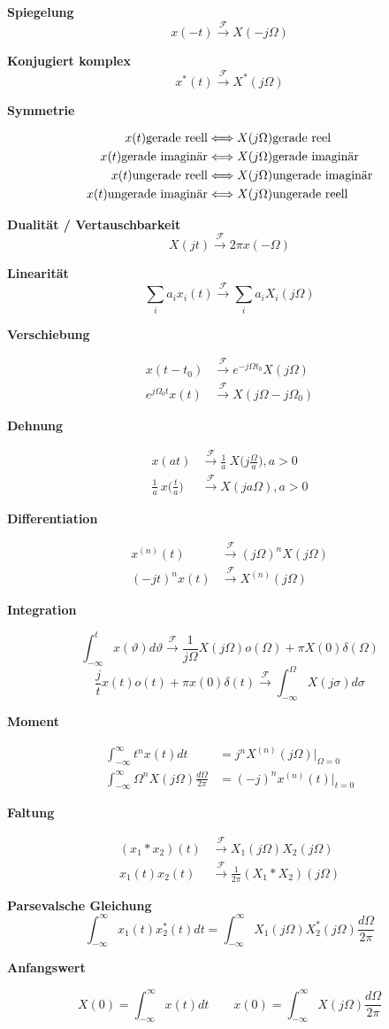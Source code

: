 \documentclass[10pt,a4paper]{article}
\newcommand{\fancyformula}[2]{
	\small
	\raggedright\sffamily\textbf{#1}
	#2
}
\newcommand{\ftransform}{
	\xrightarrow{~\mathcal{F}~}
}
\begin{document}
\begin{multicols}{2}
	
\fancyformula{Spiegelung}{\[ x(-t)\ftransform X(-j\Omega) \]}
\fancyformula{Konjugiert komplex}{\[ x^*(t) \ftransform X^*(j\Omega)\]}
\fancyformula{Symmetrie}{
\begin{align*}
	x(t) \textnormal{gerade reell} &\Longleftrightarrow X(j\Omega) \textnormal{gerade reel} \\
	x(t) \textnormal{gerade imaginär} &\Longleftrightarrow X(j\Omega) \textnormal{gerade imaginär} \\
	x(t) \textnormal{ungerade reell} &\Longleftrightarrow X(j\Omega) \textnormal{ungerade imaginär} \\
	x(t) \textnormal{ungerade imaginär} &\Longleftrightarrow X(j\Omega) \textnormal{ungerade reell} \\
\end{align*}
}
\fancyformula{Dualität / Vertauschbarkeit}{\[ X(jt)\ftransform 2\pi x(-\Omega) \]}
\fancyformula{Linearität}{\[ \sum_{i} a_i x_i(t) \ftransform \sum_{i} a_i X_i(j\Omega)\]}
\fancyformula{Verschiebung}{
\begin{align*}
	x(t-t_0) &\ftransform e^{-j\Omega t_0}X(j\Omega) \\
	e^{j\Omega_0t}x(t) &\ftransform X(j\Omega-j\Omega_0)
\end{align*}
}
\fancyformula{Dehnung}{
\begin{align*}
	x(at) &\ftransform \frac{1}{a}~X\bigg(j\frac{\Omega}{a}\bigg), a>0 \\
	\frac{1}{a}~x\bigg(\frac{t}{a}\bigg) &\ftransform X(ja\Omega), a>0
\end{align*}
}
\fancyformula{Differentiation}{
\begin{align*}
	x^{(n)}(t) &\ftransform (j\Omega)^nX(j\Omega) \\
	(-jt)^nx(t) &\ftransform X^{(n)}(j\Omega)
\end{align*}	
}
\fancyformula{Integration}{
	\[\int_{-\infty}^{t}x(\vartheta)d\vartheta \ftransform \frac{1}{j\Omega} X(j\Omega) o(\Omega)+\pi X(0)\delta(\Omega)\]
	\[\frac{j}{t}x(t)o(t)+\pi x(0) \delta(t)  \ftransform \int_{-\infty}^{\Omega}X(j\sigma)d\sigma \]
}
\fancyformula{Moment}{
\begin{align*}
	\int_{-\infty}^{\infty}t^n x(t)dt &= j^n X^{(n)}(j\Omega)|_{\Omega=0} \\
	\int_{-\infty}^{\infty}\Omega^n X(j\Omega)\frac{d\Omega}{2\pi}&=(-j)^n x^{(n)}(t)|_{t=0}
\end{align*}	
}
\fancyformula{Faltung}{
\begin{align*}
	(x_1 \ast x_2)(t) &\ftransform X_1(j\Omega)X_2(j\Omega)\\
	x_1(t)x_2(t) &\ftransform \frac{1}{2\pi} (X_1 \ast X_2)(j\Omega)
\end{align*}
}
\fancyformula{Parsevalsche Gleichung}{\[ \int_{-\infty}^{\infty}x_1(t)x_2^*(t)dt=\int_{-\infty}^{\infty}X_1(j\Omega)X_2^*(j\Omega)\frac{d\Omega}{2\pi} \]}
\fancyformula{Anfangswert}{
	\[ X(0)=\int_{-\infty}^{\infty}x(t)dt\qquad x(0)=\int_{-\infty}^{\infty}X(j\Omega)\frac{d\Omega}{2\pi} \]	
}
\end{multicols}
\end{document}
